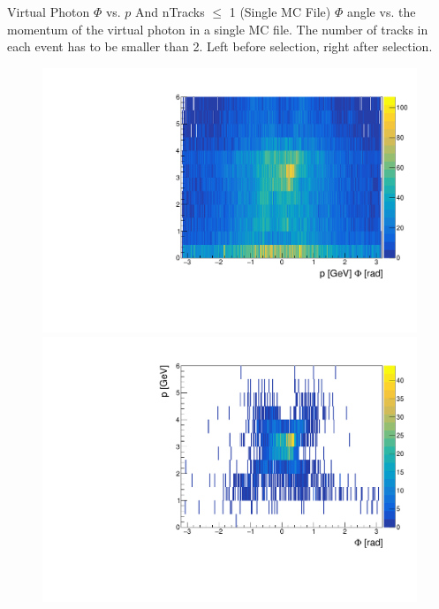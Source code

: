 \documentclass[10pt]{beamer}
\begin{document}
\begin{frame}{Virtual Photon $\Phi$ vs. $p$ And nTracks $\leq$ 1 (Single MC File)}
	$\Phi$ angle vs. the momentum of the virtual photon in a single MC file. The number of tracks in each event has to be smaller than 2. Left before selection, right after selection.
	
	\begin{figure}
		\centering
		\begin{minipage}{.5\textwidth}
			\centering
			\includegraphics[width=\textwidth]{gg/PhiMgg_BS_nT1}
			
		\end{minipage}%
		\begin{minipage}{.5\textwidth}
			\centering
			\includegraphics[width=\textwidth]{gg/PhiMgg_AS_nT1}
			
		\end{minipage}
	\end{figure}
	
	
	
\end{frame}
\end{document}
